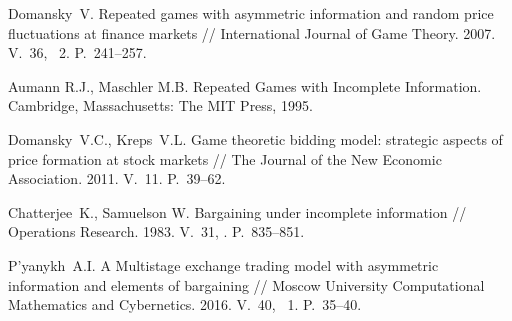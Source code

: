 \begin{references_eng}

\item %
  Domansky~V. Repeated games with asymmetric information and random price
  fluctuations at finance markets // International Jour\-nal of Game Theory. 2007.
  V.~36, \No~2. P.~241--257.

\item Aumann R.J., Maschler M.B. Repeated Games with Incomplete Information.
  Cambridge, Massachusetts: The MIT Press, 1995.

\item %
  Domansky~V.C., Kreps~V.L. Game theoretic bidding model: strate\-gic aspects of
  price formation at stock markets // The Journal of the New Economic
  Association. 2011. V.~11. P.~39--62.

\item Chatterjee~K., Samuelson W. Bargaining under incomplete informa\-tion //
  Operations Research. 1983. V.~31, . P.~835--851.

\item P'yanykh~A.I. A Multistage exchange trading model with asym\-met\-ric
  information and elements of bargaining // Moscow Uni\-ver\-si\-ty Computational
  Mathematics and Cybernetics. 2016. V.~40, \No~1. P.~35--40.

\end{references_eng}



